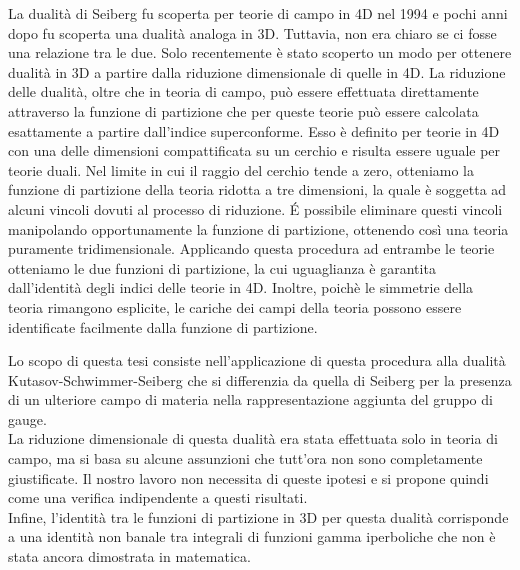 \documentclass[a4paper,oneside,11pt]{article}
\begin{document}
La dualità di Seiberg fu scoperta per teorie di campo in 4D nel 1994 e pochi anni dopo fu scoperta una dualità analoga in 3D.
Tuttavia, non era chiaro se ci fosse una relazione tra le due.
Solo recentemente è stato scoperto un modo per ottenere dualità in 3D a partire dalla riduzione dimensionale di quelle in 4D.
La riduzione delle dualità, oltre che in teoria di campo, può essere effettuata direttamente attraverso la funzione di partizione che per queste teorie può essere calcolata esattamente a partire dall'indice superconforme.
Esso è definito per teorie in 4D con una delle dimensioni compattificata su un cerchio e risulta essere uguale per teorie duali.
Nel limite in cui il raggio del cerchio tende a zero, otteniamo la funzione di partizione della teoria ridotta a tre dimensioni, la quale è soggetta ad alcuni vincoli dovuti al processo di riduzione.
\'E possibile eliminare questi vincoli manipolando opportunamente la funzione di partizione, ottenendo così una teoria puramente tridimensionale. 
Applicando questa procedura ad entrambe le teorie otteniamo le due funzioni di partizione, la cui uguaglianza è garantita dall'identità degli indici delle teorie in 4D.
Inoltre, poichè le simmetrie della teoria rimangono esplicite, le cariche dei campi della teoria possono essere identificate facilmente dalla funzione di partizione.

Lo scopo di questa tesi consiste nell'applicazione di questa procedura alla dualità Kutasov-Schwimmer-Seiberg che si differenzia da quella di Seiberg per la presenza di un ulteriore campo di materia nella rappresentazione aggiunta del gruppo di gauge. \\
La riduzione dimensionale di questa dualità era stata effettuata solo in teoria di campo, ma si basa su alcune assunzioni che tutt'ora non sono completamente giustificate.
Il nostro lavoro non necessita di queste ipotesi e si propone quindi come una verifica indipendente a questi risultati.
\\
Infine, l'identità tra le funzioni di partizione in 3D per questa dualità corrisponde a una identità non banale tra integrali di funzioni gamma iperboliche che non è stata ancora dimostrata in matematica.
\end{document}
